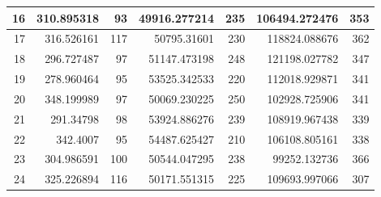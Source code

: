 \begin{table}
\begin{adjustwidth}{}{}
{{\begin{tabular}{|r|r|r|r|r|r|r|}
\hline
16                                         & 310.895318                   & 93                                    & 49916.277214                   & 235                                   & 106494.272476                & 353                                    \\ 
\hline
17                                         & 316.526161                   & 117                                   & 50795.31601                    & 230                                   & 118824.088676                & 362                                    \\ 
\hline
18                                         & 296.727487                   & 97                                    & 51147.473198                   & 248                                   & 121198.027782                & 347                                    \\ 
\hline
19                                         & 278.960464                   & 95                                    & 53525.342533                   & 220                                   & 112018.929871                & 341                                    \\ 
\hline
20                                         & 348.199989                   & 97                                    & 50069.230225                   & 250                                   & 102928.725906                & 341                                    \\ 
\hline
21                                         & 291.34798                    & 98                                    & 53924.886276                   & 239                                   & 108919.967438                & 339                                    \\ 
\hline
22                                         & 342.4007                     & 95                                    & 54487.625427                   & 210                                   & 106108.805161                & 338                                    \\ 
\hline
23                                         & 304.986591                   & 100                                   & 50544.047295                   & 238                                   & 99252.132736                 & 366                                    \\ 
\hline
24                                         & 325.226894                   & 116                                   & 50171.551315                   & 225                                   & 109693.997066                & 307                                    \\ 

\end{tabular}}}
\end{adjustwidth}
\end{table}
